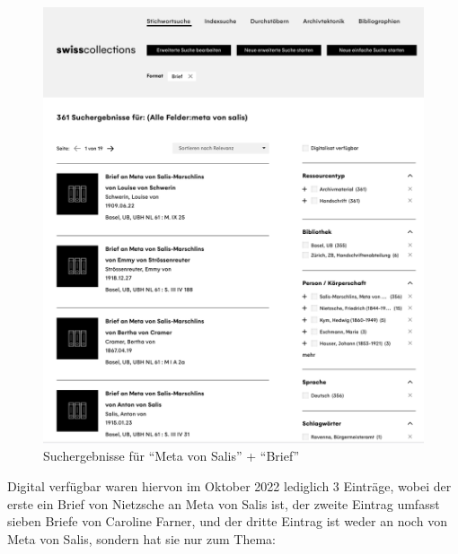 \documentclass[
  letterpaper,
]{book}
\begin{document}
\begin{figure}
\begin{minipage}[t]{0.49\linewidth}
{{\includegraphics{./images/suchergebnisse_1.png}

}

\caption{Suchergebnisse für ``Meta von Salis'' + ``Brief''}

}

\end{minipage}%

\end{figure}

Digital verfügbar waren hiervon im Oktober 2022 lediglich 3 Einträge,
wobei der erste ein Brief von Nietzsche an Meta von Salis ist, der
zweite Eintrag umfasst sieben Briefe von Caroline Farner, und der dritte
Eintrag ist weder an noch von Meta von Salis, sondern hat sie nur zum
Thema:
\end{document}

